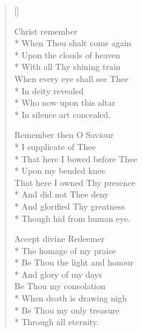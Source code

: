 \newHymn
{}

\begin{verse}[\versewidth]

\begin{altverse}
 Christ remember\\*
When Thou shalt come again\\*
Upon the clouds of heaven\\*
With all Thy shining train\\
When every eye shall see Thee\\*
In deity revealed\\*
Who now upon this altar\\*
In silence art concealed.
\end{altverse}

\begin{altverse}
Remember then O Saviour\\*
I supplicate of Thee\\*
That here I bowed before Thee\\*
Upon my bended knee\\
That here I owned Thy presence\\*
And did not Thee deny\\*
And glorified Thy greatness\\*
Though hid from human eye.
\end{altverse}

\begin{altverse}
Accept divine Redeemer\\*
The homage of my praise\\*
Be Thou the light and honour\\*
And glory of my days\\
Be Thou my consolation\\*
When death is drawing nigh\\*
Be Thou my only treasure\\*
Through all eternity.
\end{altverse}

\end{verse}

